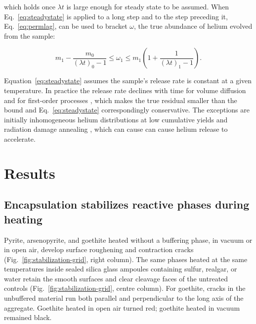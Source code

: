 which holds once $\lambda t$ is large enough for steady state to be assumed. When Eq.~\eqref{eq:steadystate} is applied to a long step and to the step preceding it, Eq.~\eqref{eq:permlag}, can be used to bracket $\omega$, the true abundance of helium evolved from the sample:

\begin{equation}
\label{eq:bound}
m_{1} - \frac{m_{0}}{(\lambda t)_{0} - 1} \leq \omega_{1} \leq m_{1}\left(1 + \frac{1}{(\lambda t)_{1} - 1}\right) .
\end{equation}

Equation~\eqref{eq:steadystate} assumes the sample's release rate is constant at a given temperature. In practice the release rate declines with time for volume diffusion \citep{wolf1996,reinersfarley1999,farleymckeon2015,farley2018,farley2024} and for first-order processes \citep{yakubovich2010,wilson1973}, which makes the true residual smaller than the bound and Eq.~\eqref{eq:steadystate} correspondingly conservative. The exceptions are initially inhomogeneous helium distributions at low cumulative yields \citep{goldsmith2020,ketcham2011,shuster2004,farley1996} and radiation damage annealing \citep{cherniak2019,guenthner2013,flowers2007,flowers2009,shuster2006}, which can cause can cause helium release to accelerate.


\section{Results}\label{sec:results}

\subsection{Encapsulation stabilizes reactive phases during heating}\label{sec:results-stabilization}

Pyrite, arsenopyrite, and goethite heated without a buffering phase, in vacuum or in open air, develop surface roughening and contraction cracks (Fig.~\ref{fig:stabilization-grid}, right column). The same phases heated at the same temperatures inside sealed silica glass ampoules containing sulfur, realgar, or water retain the smooth surfaces and clear cleavage faces of the untreated controls (Fig.~\ref{fig:stabilization-grid}, centre column). For goethite, cracks in the unbuffered material run both parallel and perpendicular to the long axis of the aggregate. Goethite heated in open air turned red; goethite heated in vacuum remained black.

